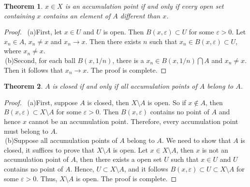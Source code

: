 \documentclass[12pt,leqno]{amsart}
\newtheorem{theorem}{Theorem}[section]
\theoremstyle{definition}
\begin{document}
\begin{theorem}
$x\in X$ is an accumulation point if and only if every open set containing $x$ contains an element of $A$ different than $x$.
\end{theorem}
\begin{proof}
$ $\newline
\hspace*{1em}\,(a)First, let $x \in U$ and $U$ is open. Then $B(x,\varepsilon)\subset U$ for some $\varepsilon > 0$. Let $x_n\in A$, $x_n \neq x$ and $x_n\to x$. Then there exists $n$ such that $x_n\in B(x,\varepsilon)\subset U$, where $x_n \neq x$. \\
\hspace*{1em}\,(b)Second, for each ball $B(x, 1/n)$, there is a $x_n\in B(x,1/n)\bigcap A$ and $x_n \neq x$. Then it follows that $x_n\to x$. The proof is complete.
\end{proof}

\medskip

\begin{theorem}
$A$ is closed if and only if all accumulation points of $A$ belong to $A$.
\end{theorem}
\begin{proof}
$ $\newline
\hspace*{1em}\,(a)First, suppose $A$ is closed, then $X\setminus A$ is open. So if $x\notin A$, then $B(x,\varepsilon)\subset X\setminus A$ for some $\varepsilon>0$. Then $B(x,\varepsilon)$ contains no point of $A$ and hence $x$ cannot be an accumulation point. Therefore, every accumulation point must belong to $A$.\\
\hspace*{1em}\,(b)Suppose all accumulation points of $A$ belong to $A$. We need to show that $A$ is closed, it suffices to prove that $X\setminus A$ is open. Let $x\in X\setminus A$, then $x$ is not an accumulation point of $A$, then there exists a open set $U$ such that $x\in U$ and $U$ contains no point of $A$. Hence, $U\subset X\setminus A$, and it follows $B(x,\varepsilon)\subset U\subset X\setminus A$ for some $\varepsilon > 0$. Thus, $X\setminus A$ is open. The proof is complete.
\end{proof}

\medskip
\end{document}
